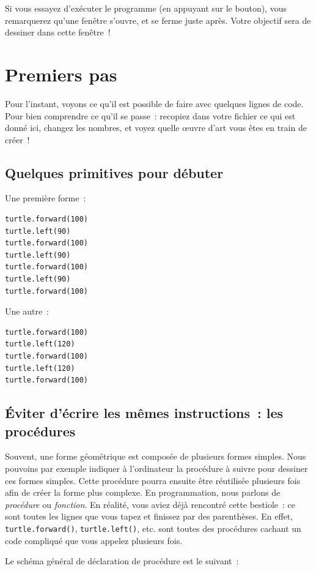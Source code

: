 \documentclass[11pt,a4paper]{article}
\begin{document}
Si vous essayez d'exécuter le programme (en appuyant sur le bouton),
vous remarquerez qu'une fenêtre s'ouvre, et se ferme juste après. Votre
objectif sera de dessiner dans cette fenêtre~!

\newpage{}
\section{Premiers pas}

Pour l'instant, voyons ce qu'il est possible de faire avec quelques lignes de
code. Pour bien comprendre ce qu'il se passe~: recopiez dans votre fichier ce
qui est donné ici, changez les nombres, et voyez quelle œuvre d'art vous êtes en
train de créer~!

\subsection{Quelques primitives pour débuter}
Une première forme~:

\begin{lstlisting}
turtle.forward(100)
turtle.left(90)
turtle.forward(100)
turtle.left(90)
turtle.forward(100)
turtle.left(90)
turtle.forward(100)
\end{lstlisting}

Une autre~:

\begin{lstlisting}
turtle.forward(100)
turtle.left(120)
turtle.forward(100)
turtle.left(120)
turtle.forward(100)
\end{lstlisting}

\subsection{Éviter d'écrire les mêmes instructions~: les procédures}

Souvent, une forme géométrique est composée de plusieurs formes simples. Nous
pouvoins par exemple indiquer à l'ordinateur la procédure à suivre pour dessiner
ces formes simples. Cette procédure pourra ensuite être réutilisée plusieurs
fois afin de créer la forme plus complexe. En programmation, nous parlons de
\emph{procédure} ou \emph{fonction}. En réalité, vous aviez déjà rencontré cette
bestiole~: ce sont toutes les lignes que vous tapez et finissez par des
parenthèses. En effet, \lstinline{turtle.forward()}, \lstinline{turtle.left()},
etc. sont toutes des procédures cachant un code compliqué que vous appelez
plusieurs fois.

Le schéma général de déclaration de procédure est le suivant~:
\end{document}
